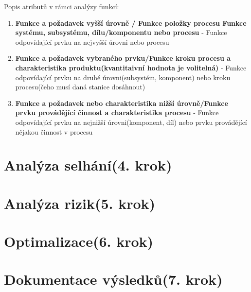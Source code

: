 Popis atributů v rámci analýzy funkcí:
\begin{enumerate}
	\item \textbf{Funkce a požadavek vyšší úrovně / Funkce položky procesu Funkce systému, subsystému, dílu/komponentu nebo procesu} - Funkce odpovídající prvku na nejvyšší úrovni nebo procesu 
	\item \textbf{Funkce a požadavek vybraného prvku/Funkce kroku procesu a charakteristika produktu(kvantitaivní hodnota je volitelná)} - Funkce odpovídající prvku na druhé úrovni(subsystém, komponent) nebo kroku procesu(čeho musí daná stanice dosáhnout)
	\item \textbf{Funkce a požadavek nebo charakteristika nižší úrovně/Funkce prvku provádějící činnost a charakteristika procesu} - Funkce odpovídající prvku na nejnižší úrovni(komponent, díl) nebo prvku provádějící nějakou činnost v procesu
\end{enumerate}



\section{Analýza selhání(4. krok)}
\section{Analýza rizik(5. krok)}
\section{Optimalizace(6. krok)}
\section{Dokumentace výsledků(7. krok)}
